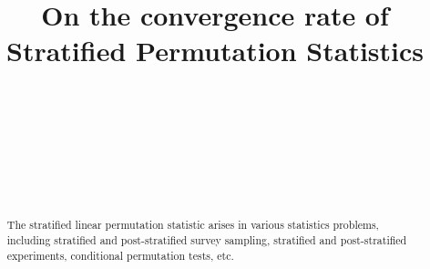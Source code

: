 \documentclass[bj,authoryear]{imsart}
\numberwithin{equation}{section}
\theoremstyle{plain}
\theoremstyle{definition}
\begin{document}
\begin{frontmatter}
\title{On the convergence rate of Stratified Permutation Statistics}

\begin{aug}
\author[A]{~}
\author[B]{~}
\author[A,C]{~}
\author[A]{~}
\address[A]{Department of Statistics and Data Science, Southern University of Science and Technology, Shenzhen, Guangdong, 518055, China}
\address[B]{School of Mathematical Sciences, Dalian University of Technology, Dalian, Liaoning, China}
\address[C]{Department of Statistics and Data Science, Shenzhen International Center for Mathematics, Southern University of Science and Technology, Shenzhen, Guangdong, 518055, China}

\end{aug}

\begin{abstract}
The stratified linear permutation statistic arises in various statistics problems, including stratified and post-stratified survey sampling, stratified and post-stratified experiments, conditional permutation tests, etc. 
% 
\end{abstract}

\begin{keyword}
\end{keyword}

\end{frontmatter}
\end{document}

